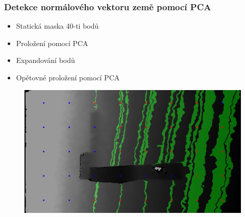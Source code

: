 \begin{frame}
    \frametitle{Detekce normálového vektoru země pomocí PCA}
    \begin{minipage}{0.39\textwidth}
        \begin{itemize}
            \item Statická maska 40-ti bodů
            \item Proložení pomocí PCA
            \item Expandování bodů
            \item Opětovné proložení pomocí PCA
        \end{itemize}
    \end{minipage}
    \begin{minipage}{0.60\textwidth}
    \begin{figure}
        \centering
        \includegraphics[width = \linewidth]{PCA_prezentace.jpg}
    \end{figure}
    \end{minipage}


\end{frame}
